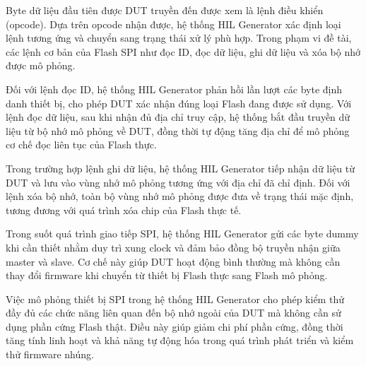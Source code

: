 Byte dữ liệu đầu tiên được DUT truyền đến được xem là lệnh điều khiển (opcode). Dựa trên opcode nhận được, hệ thống HIL Generator xác định loại lệnh tương ứng và chuyển sang trạng thái xử lý phù hợp. Trong phạm vi đề tài, các lệnh cơ bản của Flash SPI như đọc ID, đọc dữ liệu, ghi dữ liệu và xóa bộ nhớ được mô phỏng.

Đối với lệnh đọc ID, hệ thống HIL Generator phản hồi lần lượt các byte định danh thiết bị, cho phép DUT xác nhận đúng loại Flash đang được sử dụng. Với lệnh đọc dữ liệu, sau khi nhận đủ địa chỉ truy cập, hệ thống bắt đầu truyền dữ liệu từ bộ nhớ mô phỏng về DUT, đồng thời tự động tăng địa chỉ để mô phỏng cơ chế đọc liên tục của Flash thực.

Trong trường hợp lệnh ghi dữ liệu, hệ thống HIL Generator tiếp nhận dữ liệu từ DUT và lưu vào vùng nhớ mô phỏng tương ứng với địa chỉ đã chỉ định. Đối với lệnh xóa bộ nhớ, toàn bộ vùng nhớ mô phỏng được đưa về trạng thái mặc định, tương đương với quá trình xóa chip của Flash thực tế.

Trong suốt quá trình giao tiếp SPI, hệ thống HIL Generator gửi các byte dummy khi cần thiết nhằm duy trì xung clock và đảm bảo đồng bộ truyền nhận giữa master và slave. Cơ chế này giúp DUT hoạt động bình thường mà không cần thay đổi firmware khi chuyển từ thiết bị Flash thực sang Flash mô phỏng.

Việc mô phỏng thiết bị SPI trong hệ thống HIL Generator cho phép kiểm thử đầy đủ các chức năng liên quan đến bộ nhớ ngoài của DUT mà không cần sử dụng phần cứng Flash thật. Điều này giúp giảm chi phí phần cứng, đồng thời tăng tính linh hoạt và khả năng tự động hóa trong quá trình phát triển và kiểm thử firmware nhúng.
